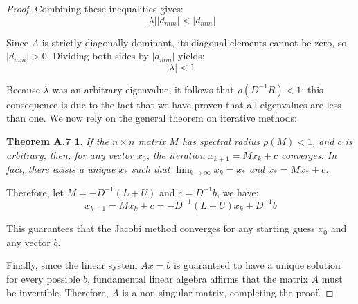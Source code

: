 \documentclass{article}
\newtheorem*{theoremA7}{Theorem A.7}
\begin{document}
\begin{proof}
Combining these inequalities gives:
\[
|\lambda| |d_{mm}| < |d_{mm}|
\]

Since $A$ is strictly diagonally dominant, its diagonal elements cannot be zero, so $|d_{mm}| > 0$. Dividing both sides by $|d_{mm}|$ yields:
\[
|\lambda| < 1
\]

Because $\lambda$ was an arbitrary eigenvalue, it follows that $\rho(D^{-1}R) < 1$: this consequence is due to the fact that we have proven that all eigenvalues are less than one. We now rely on the general theorem on iterative methods:

\begin{theoremA7}
If the $n \times n$ matrix $M$ has spectral radius $\rho (M) < 1$, and $c$ is arbitrary, then, for any vector $x_0$, the iteration $x_{k+1} = Mx_k + c$ converges. In fact, there exists a unique $x_*$ such that $\lim_{k \to \infty} x_k = x_*$ and $x_* = Mx_* + c$.
\end{theoremA7}

Therefore, let $M = -D^{-1}(L + U)$ and $c = D^{-1}b$, we have:
\[
x_{k+1} = Mx_k + c = -D^{-1}(L + U)x_k + D^{-1}b
\]

This guarantees that the Jacobi method converges for any starting guess $x_0$ and any vector $b$.

Finally, since the linear system $Ax = b$ is guaranteed to have a unique solution for every possible $b$, fundamental linear algebra affirms that the matrix $A$ must be invertible. Therefore, $A$ is a non-singular matrix, completing the proof.
\end{proof}
\end{document}
